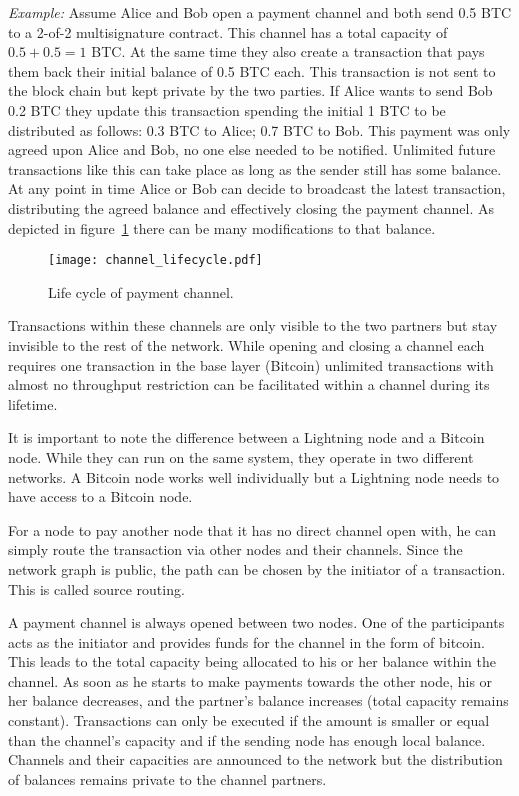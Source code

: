 \documentclass[final]{fhnwreport}       %
\begin{document}
\textit{Example:} Assume Alice and Bob open a payment channel and both send 0.5 BTC to a 2-of-2 multisignature contract. This channel has a total capacity of $0.5 + 0.5 = 1$ BTC. At the same time they also create a transaction that pays them back their initial balance of 0.5 BTC each. This transaction is not sent to the block chain but kept private by the two parties. If Alice wants to send Bob 0.2 BTC they update this transaction spending the initial 1 BTC to be distributed as follows: 0.3 BTC to Alice; 0.7 BTC to Bob. This payment was only agreed upon Alice and Bob, no one else needed to be notified. Unlimited future transactions like this can take place as long as the sender still has some balance. At any point in time Alice or Bob can decide to broadcast the latest transaction, distributing the agreed balance and effectively closing the payment channel. As depicted in figure~\ref{fig:ChannelCycle} there can be many modifications to that balance.

\begin{figure}[H]
\centering
\texttt{[image: channel\_lifecycle.pdf]}
\caption{Life cycle of payment channel.}
\label{fig:ChannelCycle}
\end{figure}

Transactions within these channels are only visible to the two partners but stay invisible to the rest of the network. While opening and closing a channel each requires one transaction in the base layer (Bitcoin) unlimited transactions with almost no throughput restriction can be facilitated within a channel during its lifetime. 

It is important to note the difference between a Lightning node and a Bitcoin node. While they can run on the same system, they operate in two different networks. A Bitcoin node works well individually but a Lightning node needs to have access to a Bitcoin node.

For a node to pay another node that it has no direct channel open with, he can simply route the transaction via other nodes and their channels. Since the network graph is public, the path can be chosen by the initiator of a transaction. This is called source routing. 

A payment channel is always opened between two nodes. One of the participants acts as the initiator and provides funds for the channel in the form of bitcoin. This leads to the total capacity being allocated to his or her balance within the channel. As soon as he starts to make payments towards the other node, his or her balance decreases, and the partner's balance increases (total capacity remains constant). Transactions can only be executed if the amount is smaller or equal than the channel's capacity and if the sending node has enough local balance. Channels and their capacities are announced to the network but the distribution of balances remains private to the channel partners.
\end{document}
